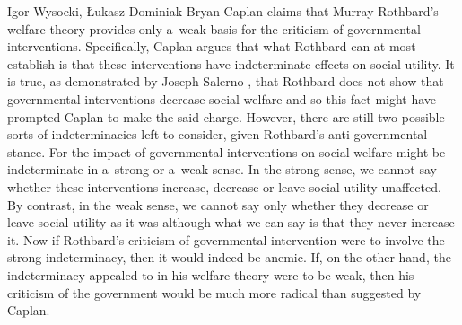 \begin{artengenv}{Igor Wysocki, Łukasz Dominiak}
\lettrine[loversize=0.13,lines=2,lraise=-0.03,nindent=0em,findent=0.2pt]%
{B}{}ryan Caplan 
\parencite*[][p.834]{caplan_austrian_1999} %
 claims that Murray Rothbard's welfare theory provides only a~weak basis for the criticism of governmental interventions. Specifically, Caplan argues that what Rothbard can at most establish is that these interventions have indeterminate effects on social utility. It is true, as demonstrated by Joseph Salerno 
\parencite*[][p.131]{salerno_mises_1993}, %
 that Rothbard does not show that governmental interventions decrease social welfare and so this fact might have prompted Caplan to make the said charge. However, there are still two possible sorts of indeterminacies left to consider, given Rothbard's anti-governmental stance. For the impact of governmental interventions on social welfare might be indeterminate in a~strong or a~weak sense. In the strong sense, we cannot say whether these interventions increase, decrease or leave social utility unaffected. By contrast, in the weak sense, we cannot say only whether they decrease or leave social utility as it was although what we can say is that they never increase it. Now if Rothbard's criticism of governmental intervention were to involve the strong indeterminacy, then it would indeed be anemic. If, on the other hand, the indeterminacy appealed to in his welfare theory were to be weak, then his criticism of the government would be much more radical than suggested by Caplan.




\end{artengenv}
